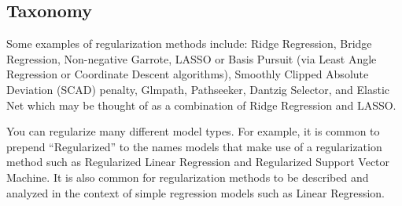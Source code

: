\begin{bibunit}
\subsection{Taxonomy}
Some examples of regularization methods include:
Ridge Regression,
Bridge Regression, 
Non-negative Garrote,
LASSO or Basis Pursuit (via Least Angle Regression or Coordinate Descent algorithms),
Smoothly Clipped Absolute Deviation (SCAD) penalty,
Glmpath,
Pathseeker,
Dantzig Selector, 
and Elastic Net which may be thought of as a combination of Ridge Regression and LASSO.

You can regularize many different model types. For example, it is common to prepend ``Regularized'' to the names models that make use of a regularization method such as Regularized Linear Regression and Regularized Support Vector Machine. It is also common for regularization methods to be described and analyzed in the context of simple regression models such as Linear Regression.


\putbib
\end{bibunit}

\newpage\begin{bibunit}\putbib\end{bibunit}
\newpage\begin{bibunit}\putbib\end{bibunit}
\newpage\begin{bibunit}\putbib\end{bibunit}

